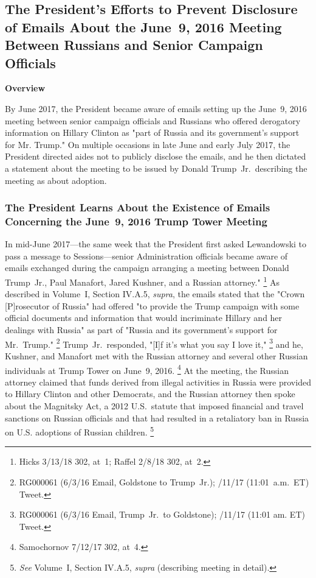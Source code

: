 \subsection{The President's Efforts to Prevent Disclosure of Emails About the June~9, 2016 Meeting Between Russians and Senior Campaign Officials}

\begin{center}
\textbf{Overview}
\end{center}

By June 2017, the President became aware of emails setting up the June~9, 2016 meeting between senior campaign officials and Russians who offered derogatory information on Hillary Clinton as "part of Russia and its government's support for Mr. Trump."
On multiple occasions in late June and early July 2017, the President directed aides not to publicly disclose the emails, and he then dictated a statement about the meeting to be issued by Donald Trump~Jr.\ describing the meeting as about adoption.

\subsubsection{The President Learns About the Existence of Emails Concerning the June~9, 2016 Trump Tower Meeting}

In mid-June 2017---the same week that the President first asked Lewandowski to pass a message to Sessions---senior Administration officials became aware of emails exchanged during the campaign arranging a meeting between Donald Trump~Jr., Paul Manafort, Jared Kushner, and a Russian attorney."%
\footnote{Hicks 3/13/18 302, at~1;
Raffel 2/8/18 302, at~2.}
As described in Volume~I, Section IV.A.5, \textit{supra}, the emails stated that the "Crown [P]rosecutor of Russia" had offered "to provide the Trump campaign with some official documents and information that would incriminate Hillary and her dealings with Russia" as part of "Russia and its government's support for Mr.~Trump."%
\footnote{RG000061 (6/3/16 Email, Goldstone to Trump~Jr.);
/11/17 (11:01~a.m.~ET) Tweet.}
Trump~Jr.\ responded, "[I]f it's what you say I love it,"%
\footnote{RG000061 (6/3/16 Email, Trump~Jr.\ to Goldstone);
/11/17 (11:01 am. ET) Tweet.}
and he, Kushner, and Manafort met with the Russian attorney and several other Russian individuals at Trump Tower on June~9, 2016.%
\footnote{Samochornov 7/12/17 302, at~4.}
At the meeting, the Russian attorney claimed that funds derived from illegal activities in Russia were provided to Hillary Clinton and other Democrats, and the Russian attorney then spoke about the Magnitsky Act, a 2012 U.S.~statute that imposed financial and travel sanctions on Russian officials and that had resulted in a retaliatory ban in Russia on U.S. adoptions of Russian children.%
\footnote{\textit{See} Volume~I, Section IV.A.5, \textit{supra} (describing meeting in detail).}


